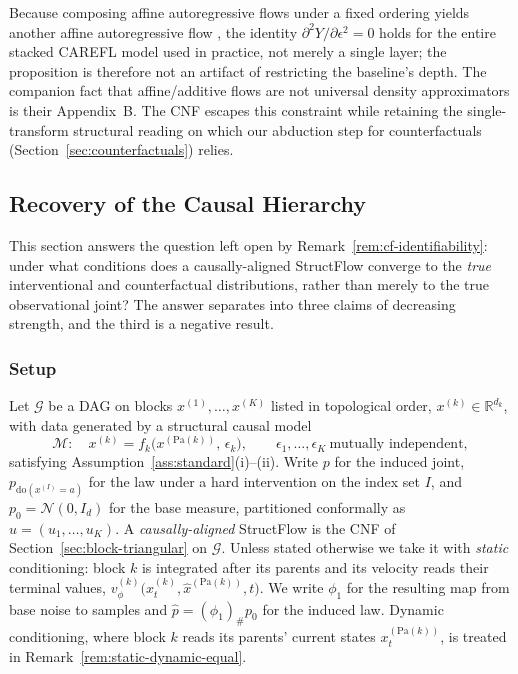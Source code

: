 \begin{remark}
Because composing affine autoregressive flows under a fixed ordering yields another affine autoregressive flow \citep[Appendix~C]{khemakhem2021causal}, the identity $\partial^2 Y/\partial\epsilon^2 = 0$ holds for the entire stacked CAREFL model used in practice, not merely a single layer; the proposition is therefore not an artifact of restricting the baseline's depth. The companion fact that affine/additive flows are not universal density approximators is their Appendix~B. The CNF escapes this constraint while retaining the single-transform structural reading on which our abduction step for counterfactuals (Section~\ref{sec:counterfactuals}) relies.
\end{remark}
\subsection{Recovery of the Causal Hierarchy}
\label{app:hierarchy}

This section answers the question left open by Remark~\ref{rem:cf-identifiability}: under
what conditions does a causally-aligned StructFlow converge to the \emph{true}
interventional and counterfactual distributions, rather than merely to the true
observational joint? The answer separates into three claims of decreasing strength, and the
third is a negative result.

\subsubsection{Setup}

Let $\mathcal{G}$ be a DAG on blocks $x^{(1)},\dots,x^{(K)}$ listed in topological order,
$x^{(k)} \in \mathbb{R}^{d_k}$, with data generated by a structural causal model
\begin{equation}
\label{eq:scm}
  \mathcal{M}: \quad x^{(k)} = f_k\bigl(x^{(\mathrm{Pa}(k))},\, \epsilon_k\bigr),
  \qquad \epsilon_1,\dots,\epsilon_K \ \text{mutually independent},
\end{equation}
satisfying Assumption~\ref{ass:standard}(i)--(ii). Write $p$ for the induced
joint, $p_{\mathrm{do}(x^{(I)}=a)}$ for the law under a hard intervention on the index set
$I$, and $p_0 = \mathcal{N}(0, I_d)$ for the base measure, partitioned conformally as
$u = (u_1,\dots,u_K)$. A \emph{causally-aligned} StructFlow is the CNF of
Section~\ref{sec:block-triangular} on $\mathcal{G}$. Unless stated otherwise we take it with
\emph{static} conditioning: block $k$ is integrated after its parents and its velocity reads
their terminal values, $v^{(k)}_\phi\bigl(x^{(k)}_t, \hat x^{(\mathrm{Pa}(k))}, t\bigr)$. We
write $\phi_1$ for the resulting map from base noise to samples and
$\hat p = (\phi_1)_\# p_0$ for the induced law. Dynamic conditioning, where block $k$ reads
its parents' current states $x^{(\mathrm{Pa}(k))}_t$, is treated in
Remark~\ref{rem:static-dynamic-equal}.

